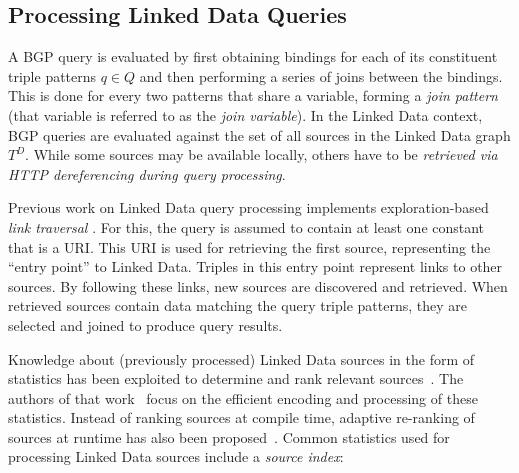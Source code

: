
\subsection{Processing Linked Data Queries} 

A BGP query is evaluated by first obtaining bindings for each of its
constituent triple patterns $q \in Q$ and then performing a series of
joins between the bindings. This is done for every two patterns that
share a variable, forming a \emph{join pattern} (that variable is
referred to as the \emph{join variable}).
In the Linked Data context, BGP queries are 
evaluated against the set of all sources in the Linked Data graph $T^D$. 
While some sources may be available locally, others have
to be \emph{retrieved via HTTP dereferencing during query processing}. 

Previous work on Linked Data query processing
implements exploration-based \emph{link traversal} 
\cite{hartig_executing_2009,hartig_zero_2011}. 
For this, the query is assumed to contain at least one constant that
is a URI. This URI is used for retrieving the first source,
representing the ``entry point'' to Linked Data. Triples in this entry
point represent links to other sources. By following these links, new
sources are discovered and retrieved. When retrieved sources contain
data matching the query triple patterns, they are selected and joined
to produce query results.

Knowledge about (previously processed) Linked Data sources in the form of statistics has been exploited 
to determine and rank relevant sources~\cite{harth_data_2010}. 
The authors of that work~\cite{harth_data_2010} focus on the efficient
encoding and processing of these statistics. Instead of ranking
sources at compile time, adaptive re-ranking of sources at runtime has
also been proposed~\cite{ladwig_linked_2010}. Common statistics used
for processing Linked Data sources include a \emph{source index}:



